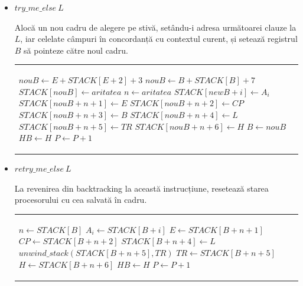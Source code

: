 \documentclass[12pt,a4paper,twoside]{report}
\begin{document}
\begin{itemize}
	\item \(try\_me\_else\  L\) \\
	\begin{minipage}{0.45\textwidth}
		   Alocă un nou cadru de alegere pe stivă, setându-i adresa următoarei clauze la $L$, iar celelate câmpuri în concordanță cu contextul curent, și setează registrul $B$ să pointeze către noul cadru.	
        \end{minipage}%
	\hfill
	\begin{minipage}{0.45\textwidth}
	\begin{tabular}{|p{\textwidth}}
	\begin{algorithmic}
		\If{$E > B$}
    			\State $nouB \gets E + STACK[E + 2] + 3$
		\Else
			\State $nouB \gets B + STACK[B] + 7$
		\EndIf
		\State $STACK[nouB] \gets aritatea$
		\State $n \gets aritatea$
		 \For{$i < n$}
            		\State $STACK[newB + i] \gets A_i$
		 \EndFor
		\State $STACK[nouB+n+1] \gets E$
		\State $STACK[nouB+n+2] \gets CP$
		\State $STACK[nouB+n+3] \gets B$
		\State $STACK[nouB+n+4] \gets L$
		\State $STACK[nouB+n+5] \gets TR$
		\State $STACK[nouB+n+6] \gets H$
		\State $B \gets nouB$
		\State $HB \gets H$
		\State $P \gets P + 1$
	\end{algorithmic}
	\end{tabular}
	\end{minipage}%
	
	\item \(retry\_me\_else\  L\) \\
	\begin{minipage}{0.45\textwidth}
		   La revenirea din backtracking la această instrucțiune, resetează starea procesorului cu cea salvată în cadru.
        \end{minipage}%
	\hfill
	\begin{minipage}{0.45\textwidth}
	\begin{tabular}{|p{\textwidth}}
	\begin{algorithmic}
		\State $n \gets STACK[B]$
		 \For{$i < n$}
            		\State $A_i \gets STACK[B + i]$
		 \EndFor
		\State $E \gets STACK[B+n+1]$
		\State $CP \gets STACK[B+n+2]$
		\State $STACK[B+n+4] \gets L$
		\State $unwind\_stack(STACK[B+n+5], TR)$
		\State $TR \gets STACK[B+n+5]$
		\State $H \gets STACK[B+n+6]$
		\State $HB \gets H$
		\State $P \gets P + 1$
	\end{algorithmic}
	\end{tabular}
	\end{minipage}%
	

\end{itemize}
\end{document}
